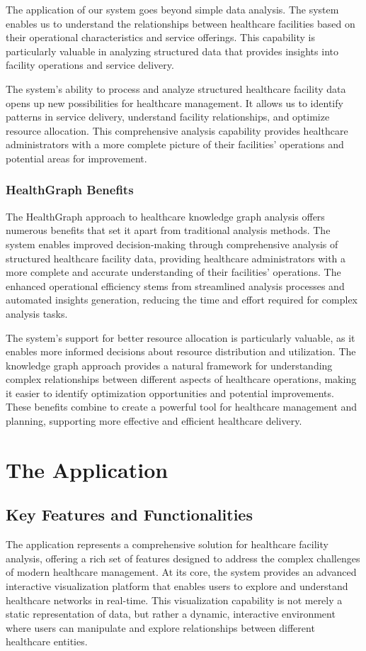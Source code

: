 \documentclass[12pt,a4paper]{report}
\begin{document}
The application of our system goes beyond simple data analysis. The system enables us to understand the relationships between healthcare facilities based on their operational characteristics and service offerings. This capability is particularly valuable in analyzing structured data that provides insights into facility operations and service delivery.

The system's ability to process and analyze structured healthcare facility data opens up new possibilities for healthcare management. It allows us to identify patterns in service delivery, understand facility relationships, and optimize resource allocation. This comprehensive analysis capability provides healthcare administrators with a more complete picture of their facilities' operations and potential areas for improvement.

\subsection{HealthGraph Benefits}
The HealthGraph approach to healthcare knowledge graph analysis offers numerous benefits that set it apart from traditional analysis methods. The system enables improved decision-making through comprehensive analysis of structured healthcare facility data, providing healthcare administrators with a more complete and accurate understanding of their facilities' operations. The enhanced operational efficiency stems from streamlined analysis processes and automated insights generation, reducing the time and effort required for complex analysis tasks.

The system's support for better resource allocation is particularly valuable, as it enables more informed decisions about resource distribution and utilization. The knowledge graph approach provides a natural framework for understanding complex relationships between different aspects of healthcare operations, making it easier to identify optimization opportunities and potential improvements. These benefits combine to create a powerful tool for healthcare management and planning, supporting more effective and efficient healthcare delivery.

\chapter{The Application}
\section{Key Features and Functionalities}
The application represents a comprehensive solution for healthcare facility analysis, offering a rich set of features designed to address the complex challenges of modern healthcare management. At its core, the system provides an advanced interactive visualization platform that enables users to explore and understand healthcare networks in real-time. This visualization capability is not merely a static representation of data, but rather a dynamic, interactive environment where users can manipulate and explore relationships between different healthcare entities.
\end{document}
